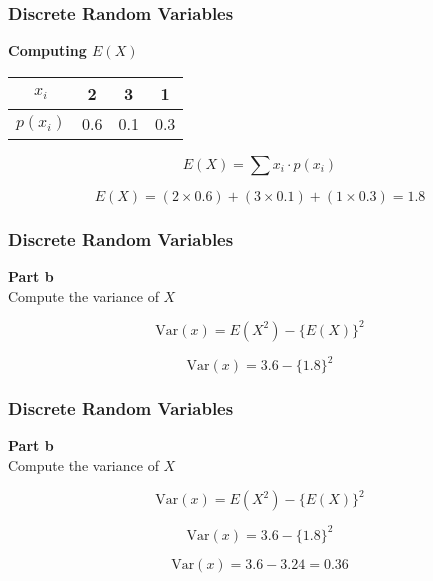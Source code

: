 \documentclass{beamer}
\begin{document}
\begin{frame}
\frametitle{Discrete Random Variables}
\Large
\vspace{-1cm}

\textbf{Computing $E(X)$}
\begin{center}
\begin{tabular}{|c|c|c|c|}
\hline
$x_i$ & 2 & 3 & 1 \\ \hline 
$p(x_i)$ & 0.6 &  0.1 & 0.3 \\ \hline
\end{tabular}
\end{center}
\[ E(X) =  \sum  x_i \cdot p(x_i)   \]


\[E(X) = (2\times 0.6) + (3 \times 0.1) + (1 \times 0.3) = 1.8 \]


\end{frame}

\begin{frame}
\frametitle{Discrete Random Variables}
\Large
\vspace{-2cm}
\textbf{Part b}\\
Compute the variance of $X$

\[ \mbox{Var}(x) = E(X^2) - \{E(X)\}^2 \]

\[ \mbox{Var}(x) = 3.6 - \{1.8\}^2 \]

\end{frame}

\begin{frame}
\frametitle{Discrete Random Variables}
\Large
\vspace{-1.5cm}
\textbf{Part b}\\
Compute the variance of $X$

\[ \mbox{Var}(x) = E(X^2) - \{E(X)\}^2 \]

\[ \mbox{Var}(x) = 3.6 - \{1.8\}^2 \]

\[ \mbox{Var}(x) = 3.6 - 3.24  = \boldsymbol{0.36} \]
\end{frame}
\end{document}
